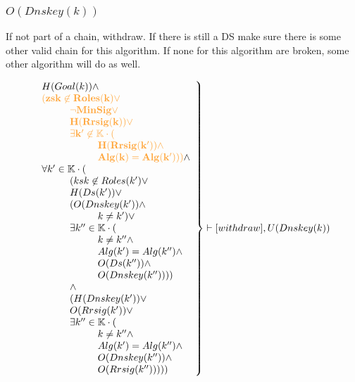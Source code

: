 \documentclass[twoside,english, a4paper]{article}
\newcommand{\highlightMinSig}[1]{\textcolor{MinSig}{\bf{#1}}}
\newcommand{\mathbox}[1]{#1}
\begin{document}
\subsubsection{$O(Dnskey(k))$}

\mathbox{

	If not part of a chain, withdraw. If there is still a DS make sure 
	there is some other valid chain for this algorithm. If none for 
	this algorithm are broken, some other algorithm will do as well.
	
	\begin{equation}
		\left.
		\begin{array}{l}
			H(Goal(k)) \wedge \\
\highlightMinSig{\hskip 0cm	(zsk \not \in Roles(k) \vee }\\
\highlightMinSig{\hskip 1cm		\neg MinSig \vee }\\
\highlightMinSig{\hskip 1cm		H(Rrsig(k)) \vee }\\
\highlightMinSig{\hskip 1cm		\exists k' \not \in \mathbb{K} \cdot (}\\
\highlightMinSig{\hskip 2cm		H(Rrsig(k')) \wedge }\\
\highlightMinSig{\hskip 2cm		Alg(k) = Alg(k')))} \wedge \\

\hskip 0cm	\forall k' \in \mathbb{K} \cdot (\\
\hskip 1cm		(ksk \not \in Roles(k') \vee\\
\hskip 1cm		H(Ds(k')) \vee \\
\hskip 1cm		(O(Dnskey(k')) \wedge \\
\hskip 2cm			k \neq k') \vee \\
\hskip 1cm		\exists k'' \in \mathbb{K} \cdot (\\
\hskip 2cm			k \neq k'' \wedge \\
\hskip 2cm			Alg(k')=Alg(k'') \wedge \\
\hskip 2cm			O(Ds(k'')) \wedge \\
\hskip 2cm			O(Dnskey(k'')))) \\
\hskip 1cm		\wedge \\
\hskip 1cm		(H(Dnskey(k')) \vee \\
\hskip 1cm		O(Rrsig(k'))  \vee \\
\hskip 1cm		\exists k'' \in \mathbb{K} \cdot (\\
\hskip 2cm			k \neq k'' \wedge \\
\hskip 2cm			Alg(k')=Alg(k'') \wedge \\
\hskip 2cm			O(Dnskey(k'')) \wedge \\
\hskip 2cm			O(Rrsig(k'')))))
		\end{array}
		\right\} \vdash [withdraw], U(Dnskey(k))
	\end{equation}
}
\end{document}
